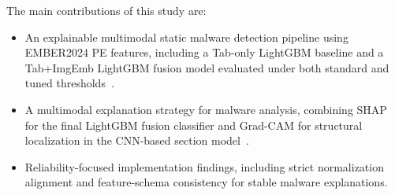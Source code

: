 \documentclass[conference]{IEEEtran}
\begin{document}
The main contributions of this study are:
%
\begin{itemize}
\item
An explainable multimodal static malware detection pipeline using EMBER2024 PE features, including a Tab-only LightGBM baseline and a Tab+ImgEmb LightGBM fusion model evaluated under both standard and tuned thresholds~\cite{JMGPR2024}.
\item 
A multimodal explanation strategy for malware analysis, combining SHAP for the final LightGBM fusion classifier and Grad-CAM for structural localization in the CNN-based section model~\cite{SCDVPB2017,LL2017}.
\item 
Reliability-focused implementation findings, including strict normalization alignment and feature-schema consistency for stable malware explanations.
\end{itemize}
\end{document}
